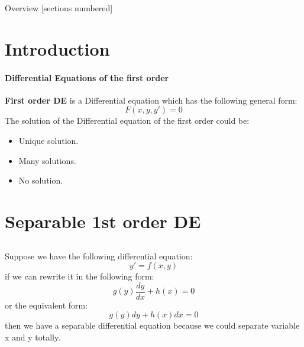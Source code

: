 \titleframe

\begin{frame}{Overview}
  [sections numbered]
  \tableofcontents[hideallsubsections]
\end{frame}


\section{Introduction}
\begin{frame}{\insertsectionhead}
  \framesubtitle{Differential Equations of the first order}
  \textbf{First order DE} is a Differential equation which has the following general form:
  \begin{equation*} \tag{1}
    F(x, y, y') = 0
  \end{equation*}
  The solution of the Differential equation of the first order could be:
    \begin{itemize}
      \item Unique solution.
      \item Many solutions.
      \item No solution.
    \end{itemize}
\end{frame}

\section{Separable 1st order DE}

\subsection{}
\begin{frame}[fragile=singleslide]{\insertsectionhead}
  \framesubtitle{\insertsubsectionhead}
  Suppose we have the following differential equation:
  \begin{equation*} \tag{2}
    y' = f(x, y)
  \end{equation*}
  if we can rewrite it in the following form:
  \begin{equation*} \tag{3}
    g(y)\frac{dy}{dx} + h(x) = 0
  \end{equation*}
  or the equivalent form:
  \begin{equation*} \label{Equ4} \tag{4}
    g(y)dy + h(x)dx = 0
  \end{equation*}
  then we have a separable differential equation because we could separate variable x and y totally.
\end{frame}

